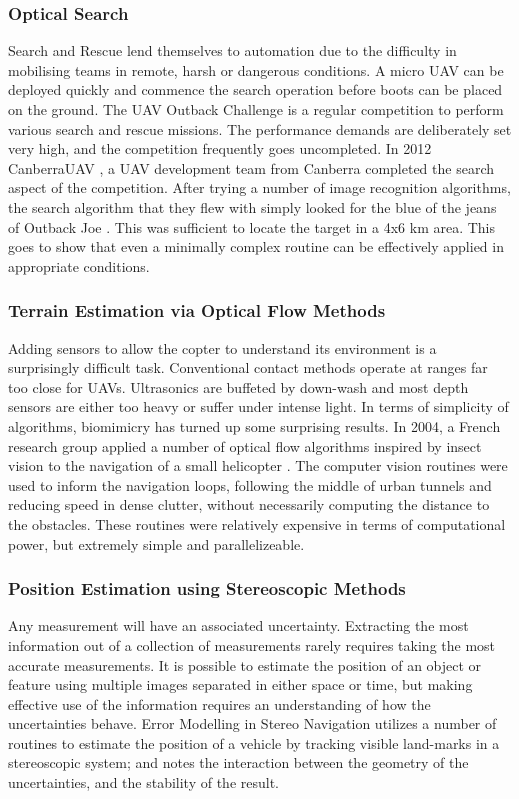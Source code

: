 \documentclass{article}
\begin{document}
      \subsubsection{Optical Search}
        Search and Rescue lend themselves to automation due to the difficulty in mobilising teams in remote, harsh or dangerous conditions.  A micro UAV can be deployed quickly and commence the search operation before boots can be placed on the ground.
        The UAV Outback Challenge \cite{OutbackChallenge} is a regular competition to perform various search and rescue missions.  The performance demands are deliberately set very high, and the competition frequently goes uncompleted.  
        In 2012 CanberraUAV \cite{canberrauav}, a UAV development team from Canberra completed the search aspect of the competition.
        After trying a number of image recognition algorithms, the search algorithm that they flew with simply looked for the blue of the jeans of Outback Joe \cite{tridge}. This was sufficient to locate the target in a 4x6 km area.  This goes to show that even a minimally complex routine can be effectively applied in appropriate conditions.

      \subsubsection{Terrain Estimation via Optical Flow Methods}
        Adding sensors to allow the copter to understand its environment is a surprisingly difficult task.  Conventional contact methods operate at ranges far too close for UAVs. Ultrasonics are buffeted by down-wash and most depth sensors are either too heavy or suffer under intense light.
        In terms of simplicity of algorithms, biomimicry has turned up some surprising results.  In 2004, a French research group applied a number of optical flow algorithms inspired by insect vision to the navigation of a small helicopter \cite{InsectFlowMethods}.  The computer vision routines were used to inform the navigation loops, following the middle of urban tunnels and reducing speed in dense clutter, without necessarily computing the distance to the obstacles.  These routines were relatively expensive in terms of computational power, but extremely simple and parallelizeable.

      \subsubsection{Position Estimation using Stereoscopic Methods}
        Any measurement will have an associated uncertainty. Extracting the most information out of a collection of measurements rarely requires taking the most accurate measurements.  It is possible to estimate the position of an object or feature using multiple images separated in either space or time, but making effective use of the information requires an understanding of how the uncertainties behave.  Error Modelling in Stereo Navigation \cite{stereoUnc} utilizes a number of routines to estimate the position of a vehicle by tracking visible land-marks in a stereoscopic system; and notes the interaction between the geometry of the uncertainties, and the stability of the result.
\end{document}

